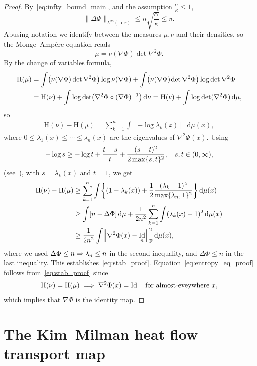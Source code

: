 \documentclass[10pt]{amsart}
\theoremstyle{definition}\newtheorem{defi}[theo]{Definition}\newtheorem{rema}[theo]{Remark}\newtheorem{exam}[theo]{Example}\newtheorem{exem}[theo]{Example}\newtheorem{nota}[theo]{Notation}
\DeclareMathOperator{\Id}{Id}
\newcommand{\Ent}{\mathrm H}
\newcommand{\dd}{n}
\newcommand{\source}{\mu}
\newcommand{\target}{\nu}
\newcommand{\lsh}{\alpha}
\newcommand{\lc}{\kappa}
\newcommand*\diff{\mathop{}\!\mathrm{d}}
\newcommand{\OT}{\Phi}
\renewcommand*{\implies}{\mathchoice{\Longrightarrow}{\Rightarrow}{\Rightarrow}{\Rightarrow}}
\let\originalleft\left
\let\originalright\right
\renewcommand{\left}{\mathopen{}\mathclose\bgroup\originalleft}
\renewcommand{\right}{\aftergroup\egroup\originalright}
\let\oldin\in
\renewcommand{\in}{\mathchoice{\oldin}{\oldin}{\,\oldin\,}{\,\oldin\,}}
\begin{document}
\begin{proof}
By~\eqref{eq:infty_bound_main}, and the assumption $\frac{\lsh}{\lc}\le 1$,
\[
\|\Delta\OT\|_{L^{\infty}(\diff x)}\le \dd\sqrt{ \frac{\lsh}{\lc}}\le \dd.
\]
Abusing notation we identify between the measures $\source,\target$ and their densities, so the Monge--Ampère equation reads
\[
\source=\target(\nabla\OT)\det\nabla^2\OT.
\]
By the change of variables formula,
\begin{align*}
\Ent(\source) &=\int \left(\target(\nabla\OT)\det\nabla^2\OT\right)\log \target(\nabla\OT)+\int \left(\target(\nabla\OT)\det\nabla^2\OT\right)\log \det\nabla^2\OT\nonumber\\
&=\Ent(\target)+\int \log \det\left(\nabla^2\OT \circ(\nabla\OT)^{-1}\right)\diff \target=\Ent(\target)+\int \log \det(\nabla^2\OT)\diff \source,
\end{align*}
so
\begin{align*}
\Ent(\target)-\Ent(\source) =\sum_{k=1}^{\dd}\int [-\log \lambda_k(x)]\diff \source(x),
\end{align*}
where $0\le \lambda_1(x)\le\cdots\le \lambda_{\dd}(x)$ are the eigenvalues of $\nabla^2\OT(x)$. Using
\begin{align*}
-\log s\ge -\log t+\frac{t-s}{t}+\frac{(s-t)^2}{2\max\{s,t\}^2},\quad s,t\in (0,\infty),
\end{align*}
(see~\cite[Proof of Lemma~2.5]{MR2672283}), with $s=\lambda_k(x)$ and $t=1$, we get
\begin{align*}
\Ent(\target)-\Ent(\source) &\ge \sum_{k=1}^{\dd}\int \left\{(1-\lambda_k(x))+\frac{1}{2}\frac{(\lambda_k-1)^2}{\max\{\lambda_{\dd},1\}^2}\right\}\diff \source(x)\\
&\ge \int \left[\dd-\Delta\OT \right]\diff \source+ \frac{1}{2\dd^2}\sum_{k=1}^{\dd}\int(\lambda_k(x)-1)^2\diff \source(x)\\
&\ge \frac{1}{2\dd^2}\int\left\|\nabla^2\OT(x) -\Id_{\dd}\right\|_{\text{F}}^2\diff \source(x),
\end{align*}
where we used $\Delta \OT\le \dd\implies \lambda_{\dd}\le \dd$ in the second inequality, and $\Delta \OT\le \dd$ in the last inequality. This establishes~\eqref{eq:stab_proof}. Equation~\eqref{eq:entropy_eq_proof} follows from~\eqref{eq:stab_proof} since
\[
\Ent(\target)= \Ent(\source)\;\implies \;\nabla^2\OT(x)=\Id\quad \textnormal{for almost-eveywhere $x$},
\]
which implies that $\nabla\OT$ is the identity map.
\end{proof}



\section{The Kim--Milman heat flow transport map}\label{sec:KM}
\end{document}
